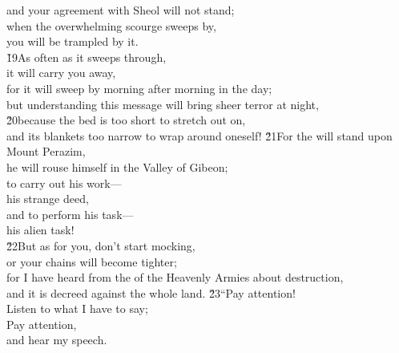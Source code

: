 \begin{poetry}
\poemll    and your agreement with Sheol will not stand; \\
\poeml when the overwhelming scourge sweeps by, \\
\poemll    you will be trampled by it. \\
\poeml \v{19}As often as it sweeps through, \\
\poemll    it will carry you away, \\
\poeml for it will sweep by morning after morning in the day; \\
\poemll    but understanding this message will bring sheer terror at night, \\
\poeml \v{20}because the bed is too short to stretch out on, \\
\poemll    and its blankets too narrow to wrap around oneself!
\poeml \v{21}For the  will stand upon Mount Perazim, \\
\poemll    he will rouse himself in the Valley of Gibeon; \\
\poeml to carry out his work--- \\
\poemll    his strange deed, \\
\poeml and to perform his task--- \\
\poemll    his alien task! \\
\poeml \v{22}But as for you, don't start mocking, \\
\poemll    or your chains will become tighter; \\
\poeml for I have heard from the  of the Heavenly Armies about destruction, \\
\poemll    and it is decreed against the whole land.
\poeml \v{23}``Pay attention! \\
\poemll    Listen to what I have to say; \\
\poeml Pay attention, \\
\poemll    and hear my speech. \\

\end{poetry}
